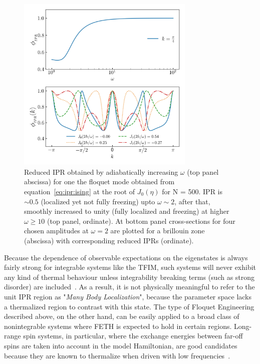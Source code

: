 \documentclass[%
reprint,
superscriptaddress,
linenumbers,
amsmath,amssymb,
aps,
prb,
showkeys,
]{revtex4-2}
\begin{document}
	
	
	\begin{figure}[t!]
		\centering
		\includegraphics[width = 8.5cm]{ising_exact_lowfr_ipr.jpeg}
		\caption{Reduced IPR obtained by adiabatically increasing $\omega$ (top panel abscissa) for one the floquet mode obtained from equation~\ref{eq:ipr:ising} at the root of $J_0(\eta)$ for N = 500. IPR is $\sim 0.5$ (localized yet not fully freezing) upto $\omega \sim 2$, after that, smoothly increased to unity (fully localized and freezing) at higher $\omega \geq 10$ (top panel, ordinate). At bottom panel cross-sections for four chosen amplitudes at $\omega =2$ are plotted for a brillouin zone (abscissa) with corresponding reduced IPRs (ordinate).}
		\label{fig:ipr:isinglowfrk}
	\end{figure}
	
	Because the dependence of observable expectations on the eigenstates is always fairly strong for integrable systems like the TFIM, such systems will never exhibit any kind of thermal behaviour unless integrability breaking terms (such as strong disorder) are included~\cite{roy_fate_2015}. As a result, it is not physically meaningful to refer to the unit IPR region as "\emph{Many Body Localization}", because the parameter space lacks a thermalized region to contrast with this state. The type of Floquet Engineering described above, on the other hand, can be easily applied to a broad class of nonintegrable systems where FETH is expected to hold in certain regions. Long-range spin systems, in particular, where the exchange energies between far-off spins are taken into account in the model Hamiltonian, are good candidates because they are known to thermalize when driven with low frequencies~\cite{russomanno_thermalization_2015}.
\end{document}
